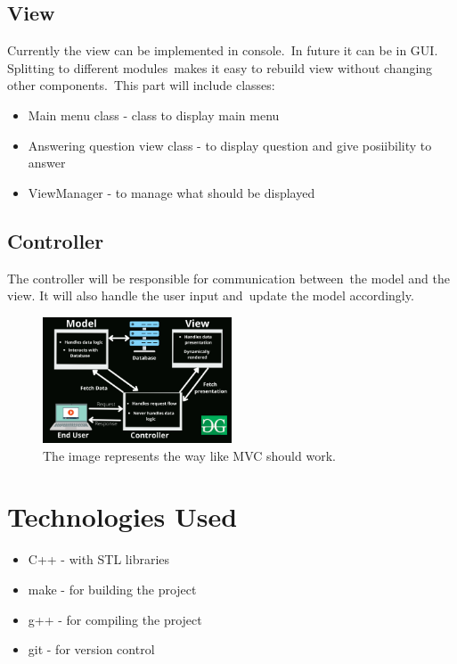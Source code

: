 \documentclass[a4paper,12pt]{article}
\begin{document}
\subsection{View}
Currently the view can be implemented in console.\
In future it can be in GUI. Splitting to different modules\
makes it easy to rebuild view without changing other components.\
This part will include classes:
\begin{itemize}
    \item Main menu class - class to display main menu
    \item Answering question view class - to display question and give posiibility to answer
    \item ViewManager - to manage what should be displayed
\end{itemize}
\subsection{Controller}
The controller will be responsible for communication between\
the model and the view. It will also handle the user input and\
update the model accordingly.\newline \newline

\begin{figure}[h]
    \centering
    \includegraphics[width=0.5\textwidth]{images/Model1.png}
    \caption{The image represents the way like MVC should work.}
    \label{fig:class_diagram}
\end{figure}



\section{Technologies Used}
\begin{itemize}
    \item C++ - with STL libraries
    \item make - for building the project
    \item g++ - for compiling the project
    \item git - for version control
\end{itemize}
\end{document}
